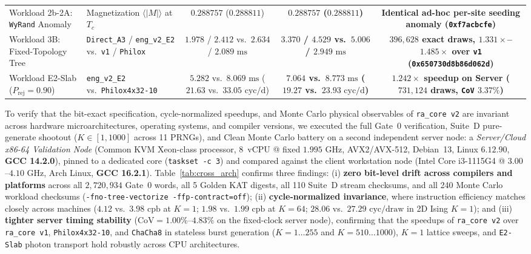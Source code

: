 \documentclass[conference]{IEEEtran}
\begin{document}
\begin{table}[t]
{\begin{tabular}{llccc}
Workload 2b-2A: \texttt{WyRand} Anomaly & Magnetization $\langle |M| \rangle$ at $T_c$ & $0.288757$ ($0.288811$) & \textbf{$0.288757$ ($0.288811$)} & \textbf{Identical ad-hoc per-site seeding anomaly (\texttt{0xf7acbcfe})} \\
Workload 3B: Fixed-Topology Tree & \texttt{Direct\_A3} / \texttt{eng\_v2\_E2} vs.\ \texttt{v1} / \texttt{Philox} & $1.978$ / $2.412$ vs.\ $2.634$ / $2.089\text{ ms}$ & \textbf{$3.370$ / $4.529$ vs.\ $5.006$ / $2.949\text{ ms}$} & \textbf{$396{,}628$ exact draws, $1.331\times$--$1.485\times$ over \texttt{v1} (\texttt{0x650730d8b86d062d})} \\
Workload E2-Slab ($P_{\text{rej}}=0.90$) & \texttt{eng\_v2\_E2} vs.\ \texttt{Philox4x32-10} & $5.282$ vs.\ $8.069\text{ ms}$ ($21.63$ vs.\ $33.05\text{ cyc/d}$) & \textbf{$7.064$ vs.\ $8.773\text{ ms}$ ($19.27$ vs.\ $23.93\text{ cyc/d}$)} & \textbf{$1.242\times$ speedup on Server ($731{,}124$ draws, \texttt{CoV} $3.37\%$)} \\
\bottomrule
\end{tabular}%
}
\end{table}

To verify that the bit-exact specification, cycle-normalized speedups, and Monte Carlo physical observables of \texttt{ra\_core v2} are invariant across hardware microarchitectures, operating systems, and compiler versions, we executed the full Gate~0 verification, Suite~D pure-generate shootout ($K \in [1, 1000]$ across 11 PRNGs), and Clean Monte Carlo battery on a second independent server node: a \emph{Server/Cloud x86-64 Validation Node} (Common KVM Xeon-class processor, 8~vCPU @ fixed $1.995\text{ GHz}$, AVX2/AVX-512, Debian~13, Linux $6.12.90$, \textbf{GCC 14.2.0}), pinned to a dedicated core (\texttt{taskset -c 3}) and compared against the client workstation node (Intel Core i3-1115G4 @ $3.00$--$4.10\text{ GHz}$, Arch Linux, \textbf{GCC 16.2.1}). Table~\ref{tab:cross_arch} confirms three findings: (i) \textbf{zero bit-level drift across compilers and platforms} across all $2{,}720{,}934$ Gate~0 words, all 5 Golden KAT digests, all 110 Suite~D stream checksums, and all 240 Monte Carlo workload checksums (\texttt{-fno-tree-vectorize -ffp-contract=off}); (ii) \textbf{cycle-normalized invariance}, where instruction efficiency matches closely across machines ($4.12$ vs.\ $3.98\text{ cpb}$ at $K=1$; $1.98$ vs.\ $1.99\text{ cpb}$ at $K=64$; $28.06$ vs.\ $27.29\text{ cyc/draw}$ in 2D Ising $K=1$); and (iii) \textbf{tighter server timing stability} ($\text{CoV} = 1.00\%$--$4.83\%$ on the fixed-clock server node), confirming that the speedups of \texttt{ra\_core v2} over \texttt{ra\_core v1}, \texttt{Philox4x32-10}, and \texttt{ChaCha8} in stateless burst generation ($K=1\ldots 255$ and $K=510\ldots 1000$), $K=1$ lattice sweeps, and \texttt{E2-Slab} photon transport hold robustly across CPU architectures.
\end{document}
